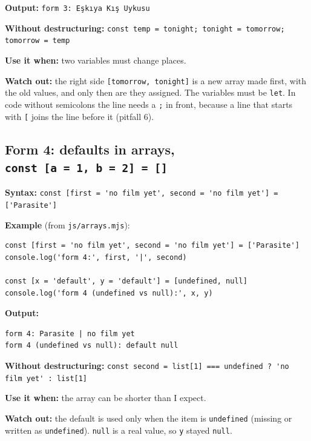 \documentclass[
]{article}
\newcommand{\passthrough}[1]{#1}
\begin{document}
\textbf{Output:} \passthrough{\lstinline!form 3: Eşkıya Kış Uykusu!}

\textbf{Without destructuring:}
\passthrough{\lstinline!const temp = tonight; tonight = tomorrow; tomorrow = temp!}

\textbf{Use it when:} two variables must change places.

\textbf{Watch out:} the right side
\passthrough{\lstinline![tomorrow, tonight]!} is a new array made first,
with the old values, and only then are they assigned. The variables must
be \passthrough{\lstinline!let!}. In code without semicolons the line
needs a \passthrough{\lstinline!;!} in front, because a line that starts
with \passthrough{\lstinline![!} joins the line before it (pitfall 6).

\hypertarget{form-4-defaults-in-arrays-const-a-1-b-2}{%
\subsection{\texorpdfstring{Form 4: defaults in arrays,
\texttt{const\ {[}a\ =\ 1,\ b\ =\ 2{]}\ =\ {[}{]}}}{Form 4: defaults in arrays, const {[}a = 1, b = 2{]} = {[}{]}}}\label{form-4-defaults-in-arrays-const-a-1-b-2}}

\textbf{Syntax:}
\passthrough{\lstinline!const [first = 'no film yet', second = 'no film yet'] = ['Parasite']!}

\textbf{Example} (from \passthrough{\lstinline!js/arrays.mjs!}):

\begin{lstlisting}
const [first = 'no film yet', second = 'no film yet'] = ['Parasite']
console.log('form 4:', first, '|', second)

const [x = 'default', y = 'default'] = [undefined, null]
console.log('form 4 (undefined vs null):', x, y)
\end{lstlisting}

\textbf{Output:}

\begin{lstlisting}
form 4: Parasite | no film yet
form 4 (undefined vs null): default null
\end{lstlisting}

\textbf{Without destructuring:}
\passthrough{\lstinline!const second = list[1] === undefined ? 'no film yet' : list[1]!}

\textbf{Use it when:} the array can be shorter than I expect.

\textbf{Watch out:} the default is used only when the item is
\passthrough{\lstinline!undefined!} (missing or written as
\passthrough{\lstinline!undefined!}). \passthrough{\lstinline!null!} is
a real value, so \passthrough{\lstinline!y!} stayed
\passthrough{\lstinline!null!}.
\end{document}
